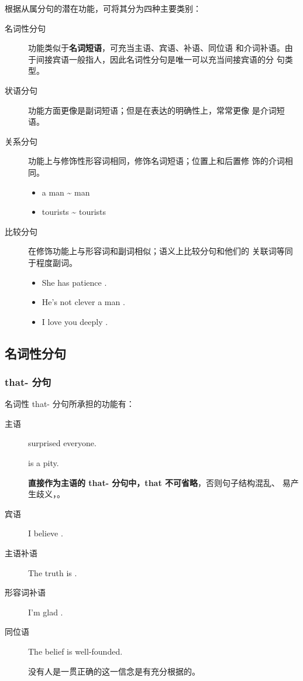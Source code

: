 根据从属分句的潜在功能，可将其分为四种主要类别：
\begin{description}
\item[名词性分句] 功能类似于\textbf{名词短语}，可充当主语、宾语、补语、同位语
  和介词补语。由于间接宾语一般指人，因此名词性分句是唯一可以充当间接宾语的分
  句类型。

\item[状语分句] 功能方面更像是副词短语；但是在表达的明确性上，常常更像
  是介词短语。

\item[关系分句] 功能上与修饰性形容词相同，修饰名词短语；位置上和后置修
  饰的介词相同。
  \begin{itemize}
  \item a man  \~{}  man
  \item tourists  \~{} tourists 
  \end{itemize}

\item[比较分句] 在修饰功能上与形容词和副词相似；语义上比较分句和他们的
  关联词等同于程度副词。
  \begin{itemize}
  \item She has  patience .
  \item He's not  clever a man .
  \item I love you  deeply .
  \end{itemize}
\end{description}

\subsection{名词性分句}

\subsubsection{that- 分句}
\label{subsubsec:thatclause}

名词性 that- 分句所承担的功能有：
\begin{description}
\item[主语]  surprised everyone.

   is a pity.

  \textbf{直接作为主语的 that- 分句中，that 不可省略}，否则句子结构混乱、
  易产生歧义，。

\item[宾语] I believe .
\item[主语补语] The truth is .
\item[形容词补语] I'm glad .

\item[同位语] The belief  is well-founded.

  没有人是一贯正确的这一信念是有充分根据的。
\end{description}

